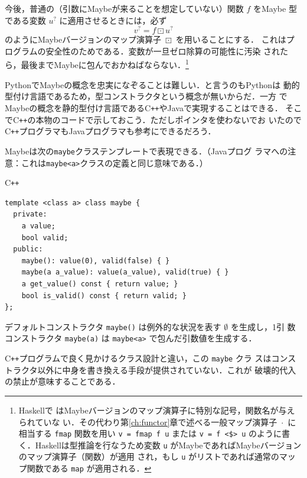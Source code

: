 \documentclass[a5paper,twoside,fleqn,draft]{jsbook}
\newcommand{\programminglanguage}[1]{\textsf{#1}}
\newcommand{\cxx}{\programminglanguage{C}\texttt{++}}
\newcommand{\haskell}{\programminglanguage{Haskell}}
\newcommand{\java}{\programminglanguage{Java}}
\newcommand{\python}{\programminglanguage{Python}}
\newcommand{\code}[1]{\texttt{#1}}
\newenvironment{cxxcode}{\begin{itembox}[r]{\cxx}}{\end{itembox}}
\newcommand{\mNothing}{\emptyset}
\DeclareMathOperator{\mMap}{\cdot} %
\DeclareMathOperator{\mMapMaybe}{\boxdot}
\newcommand{\mMaybe}[1]{{#1}^?}
\begin{document}
今後，普通の（引数にMaybeが来ることを想定していない）関数 $f$ をMaybe
型である変数 $\mMaybe{u}$ に適用させるときには，必ず
\begin{equation}
  \mMaybe{v}=f\mMapMaybe\mMaybe{u}
\end{equation}
のようにMaybeバージョンのマップ演算子 $\mMapMaybe$ を用いることにする．
これはプログラムの安全性のためである．変数が一旦ゼロ除算の可能性に汚染
されたら，最後までMaybeに包んでおかねばならない．\footnote{\haskell で
  はMaybeバージョンのマップ演算子に特別な記号，関数名が与えられていな
  い．その代わり第\ref{ch:functor}章で述べる一般マップ演算子 $\mMap$
  に相当する \code{fmap} 関数を用い \code{v = fmap f u} または \code{v
    = f <\$> u} のように書く．\haskell は型推論を行なうため変数
  \code{u} がMaybeであればMaybeバージョンのマップ演算子（関数）が適用
  され，もし \code{u} がリストであれば通常のマップ関数である
  \code{map} が適用される．}

\python でMaybeの概念を忠実になぞることは難しい．と言うのも\python は
動的型付け言語であるため，型コンストラクタという概念が無いからだ．一方
でMaybeの概念を静的型付け言語である\cxx や\java で実現することはできる．
そこで\cxx の本物のコードで示しておこう．ただしポインタを使わないでお
いたので\cxx プログラマも\java プログラマも参考にできるだろう．

Maybeは次の\code{maybe}クラステンプレートで表現できる．（\java プログ
  ラマへの注意：これは\code{maybe<a>}クラスの定義と同じ意味である．）
\begin{cxxcode}
\begin{verbatim}
template <class a> class maybe {
  private:
    a value;
    bool valid;
  public:
    maybe(): value(0), valid(false) { }
    maybe(a a_value): value(a_value), valid(true) { }
    a get_value() const { return value; }
    bool is_valid() const { return valid; }
};
\end{verbatim}
\end{cxxcode}
デフォルトコンストラクタ \code{maybe()} は例外的な状況を表す $\mNothing$ を生成し，1引
数コンストラクタ \code{maybe(a)} は \code{maybe<a>} で包んだ引数値を生成する．

\cxx プログラムで良く見かけるクラス設計と違い，この \code{maybe} クラ
スはコンストラクタ以外に中身を書き換える手段が提供されていない．これが
破壊的代入の禁止が意味することである．
\end{document}
